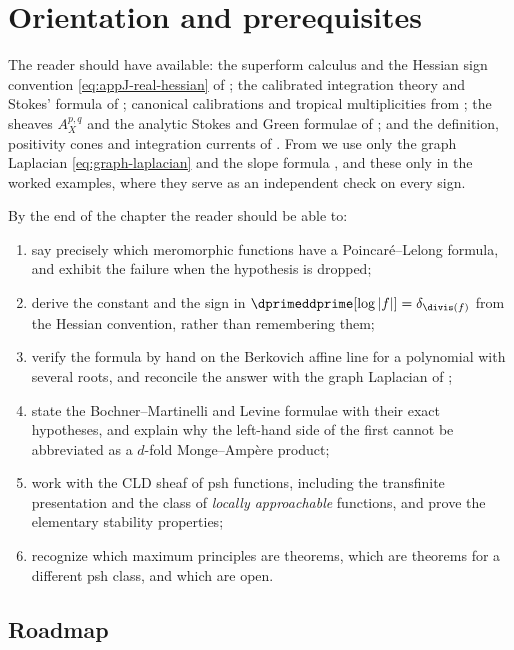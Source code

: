 \section{Orientation and prerequisites}
\label{sec:ch15-orientation}

The reader should have available: the superform calculus and the Hessian sign
convention \eqref{eq:appJ-real-hessian} of ; the
calibrated integration theory and Stokes' formula of
; canonical calibrations and tropical
multiplicities from ; the sheaves
$A_X^{p,q}$ and the analytic Stokes and Green formulae of
; and the definition, positivity cones and integration
currents of .  From  we use only the
graph Laplacian \eqref{eq:graph-laplacian} and the slope formula
, and these only in the worked examples, where
they serve as an independent check on every sign.

By the end of the chapter the reader should be able to:
\begin{enumerate}
\item say precisely which meromorphic functions have a Poincar\'e--Lelong
  formula, and exhibit the failure when the hypothesis is dropped;
\item derive the constant and the sign in
  $\dprimeddprime[\log|f|]=\delta_{\divis(f)}$ from the Hessian convention,
  rather than remembering them;
\item verify the formula by hand on the Berkovich affine line for a
  polynomial with several roots, and reconcile the answer with the graph
  Laplacian of ;
\item state the Bochner--Martinelli and Levine formulae with their exact
  hypotheses, and explain why the left-hand side of the first cannot be
  abbreviated as a $d$-fold Monge--Amp\`ere product;
\item work with the CLD sheaf of psh functions, including the transfinite
  presentation and the class of \emph{locally approachable} functions, and
  prove the elementary stability properties;
\item recognize which maximum principles are theorems, which are theorems for
  a different psh class, and which are open.
\end{enumerate}

\subsection*{Roadmap}


